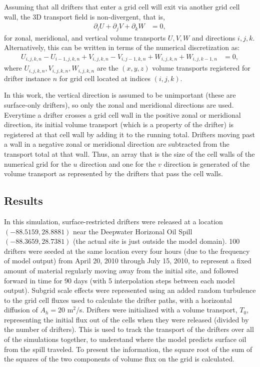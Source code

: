 \documentclass[11pt]{article}
\begin{document}
Assuming that all drifters that enter a grid cell will exit via another grid cell wall, the 3D transport field is non-divergent, that is,
\begin{align}
    \partial_i U + \partial_j V + \partial_k W &= 0, \label{transport}
\end{align}
for zonal, meridional, and vertical volume transports $U,V,W$ and directions $i,j,k$. Alternatively, this can be written in terms of the numerical discretization as:
\begin{align}
    U_{i,j,k,n} - U_{i-1,j,k,n} + V_{i,j,k,n} - V_{i,j-1,k,n} + W_{i,j,k,n} + W_{i,j,k-1,n} &= 0, \label{transport_discretized}
\end{align}
where $U_{i,j,k,n}, V_{i,j,k,n}, W_{i,j,k,n}$ are the $(x,y,z)$ volume transports registered for drifter instance $n$ for grid cell located at indices $(i,j,k)$. 

In this work, the vertical direction is assumed to be unimportant (these are surface-only drifters), so only the zonal and meridional directions are used. Everytime a drifter crosses a grid cell wall in the positive zonal or meridional direction, its initial volume transport (which is a property of the drifter) is registered at that cell wall by adding it to the running total. Drifters moving past a wall in a negative zonal or meridional direction are subtracted from the transport total at that wall. Thus, an array that is the size of the cell walls of the numerical grid for the $u$ direction and one for the $v$ direction is generated of the volume transport as represented by the drifters that pass the cell walls.  

\subsection{Results}

In this simulation, surface-restricted drifters were released at a location $(-88.5159,28.8881)$ near the Deepwater Horizonal Oil Spill $(-88.3659,28.7381)$ (the actual site is just outside the model domain). 100 drifters were seeded at the same location every four hours (due to the frequency of model output) from April 20, 2010 through July 15, 2010, to represent a fixed amount of material regularly moving away from the initial site, and followed forward in time for 90 days (with 5 interpolation steps between each model output). Subgrid scale effects were represented using an added random turbulence to the grid cell fluxes used to calculate the drifter paths, with a horizontal diffusion of $A_h=20$ m$^2$/s. Drifters were initialized with a volume transport, $T_0$, representing the initial flux out of the cells when they were released (divided by the number of drifters). This is used to track the transport of the drifters over all of the simulations together, to understand where the model predicts surface oil from the spill traveled. To present the information, the square root of the sum of the squares of the two components of volume flux on the grid is calculated. 
\end{document}

